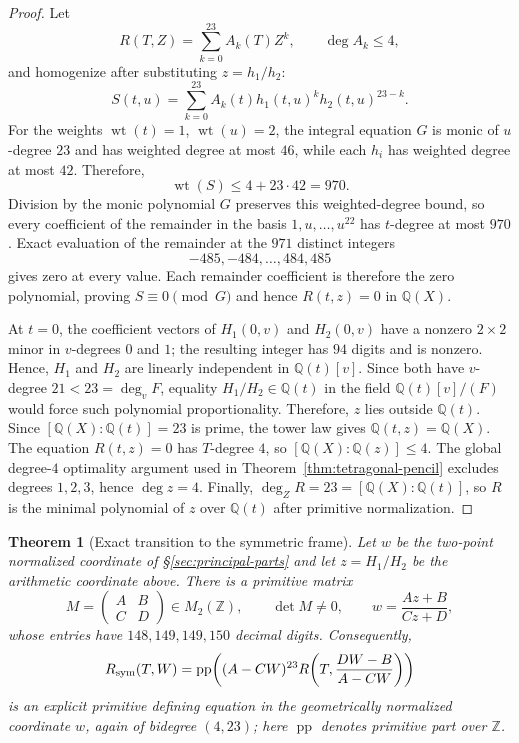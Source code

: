 \documentclass[11pt]{article}
\newtheorem{theorem}{Theorem}[section]
\newcommand{\Q}{\mathbb Q}
\begin{document}
\begin{proof}
Let
\[
 R(T,Z)=\sum_{k=0}^{23}A_k(T)Z^k,
 \qquad \deg A_k\le4,
\]
and homogenize after substituting $z=h_1/h_2$:
\[
 S(t,u)=\sum_{k=0}^{23}A_k(t)h_1(t,u)^k h_2(t,u)^{23-k}.
\]
For the weights $\operatorname{wt}(t)=1$, $\operatorname{wt}(u)=2$, the integral equation $G$ is monic of $u$-degree $23$ and has weighted degree at most $46$, while each $h_i$ has weighted degree at most $42$.  Therefore,
\[
 \operatorname{wt}(S)\le4+23\cdot42=970.
\]
Division by the monic polynomial $G$ preserves this weighted-degree bound, so every coefficient of the remainder in the basis $1,u,\ldots,u^{22}$ has $t$-degree at most $970$.  Exact evaluation of the remainder at the $971$ distinct integers
\[
 -485,-484,\ldots,484,485
\]
gives zero at every value.  Each remainder coefficient is therefore the zero polynomial, proving $S\equiv0\pmod G$ and hence $R(t,z)=0$ in $\Q(X)$.

At $t=0$, the coefficient vectors of $H_1(0,v)$ and $H_2(0,v)$ have a nonzero $2\times2$ minor in $v$-degrees $0$ and $1$; the resulting integer has $94$ digits and is nonzero.  Hence, $H_1$ and $H_2$ are linearly independent in $\Q(t)[v]$.  Since both have $v$-degree $21<23=\deg_v F$, equality $H_1/H_2\in\Q(t)$ in the field $\Q(t)[v]/(F)$ would force such polynomial proportionality.  Therefore, $z$ lies outside $\Q(t)$.  Since $[\Q(X):\Q(t)]=23$ is prime, the tower law gives $\Q(t,z)=\Q(X)$.  The equation $R(t,z)=0$ has $T$-degree $4$, so $[\Q(X):\Q(z)]\le4$.  The global degree-$4$ optimality argument used in Theorem~\ref{thm:tetragonal-pencil} excludes degrees $1,2,3$, hence $\deg z=4$.  Finally, $\deg_ZR=23=[\Q(X):\Q(t)]$, so $R$ is the minimal polynomial of $z$ over $\Q(t)$ after primitive normalization.
\end{proof}

\begin{theorem}[Exact transition to the symmetric frame]\label{thm:frame-transition}
Let $w$ be the two-point normalized coordinate of \S\ref{sec:principal-parts} and let $z=H_1/H_2$ be the arithmetic coordinate above.  There is a primitive matrix
\[
 M=\begin{pmatrix}A&B\\ C&D\end{pmatrix}\in M_2(\mathbb Z),\qquad
 \det M\ne0,\qquad
 \boxed{\displaystyle w=\frac{Az+B}{Cz+D}},
\]
whose entries have $148,149,149,150$ decimal digits.
Consequently,
\[
 R_{\rm sym}(T,W)=\operatorname{pp}\!\left((A-CW)^{23}
 R\!\left(T,\frac{DW-B}{A-CW}\right)\right)
\]
is an explicit primitive defining equation in the geometrically normalized coordinate $w$, again of bidegree $(4,23)$; here $\operatorname{pp}$ denotes primitive part over $\mathbb Z$.
\end{theorem}
\end{document}
